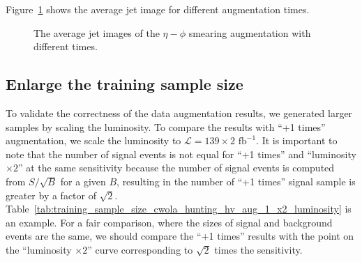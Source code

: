 \documentclass[12pt]{article}
\begin{document}
         Figure~\ref{fig:eta_phi_smearing_phi_jet_constituent_average_jet_image_aug_1_3} shows the average jet image for different augmentation times.
         \begin{figure}[htpb]
            \centering
            \caption{The average jet images of the $\eta-\phi$ smearing augmentation with different times.}
            \label{fig:eta_phi_smearing_phi_jet_constituent_average_jet_image_aug_1_3}
        \end{figure}
    \subsection{Enlarge the training sample size}%
    \label{sub:enlarge_the_training_sample_size}
        To validate the correctness of the data augmentation results, we generated larger samples by scaling the luminosity. To compare the results with ``+1 times'' augmentation, we scale the luminosity to $\mathcal{L} = 139 \times 2 \text{ fb}^{-1}$. It is important to note that the number of signal events is not equal for ``+1 times'' and ``luminosity $\times 2$'' at the same sensitivity because the number of signal events is computed from $S / \sqrt{B}$ for a given $B$, resulting in the number of ``+1 times'' signal sample is greater by a factor of $\sqrt{2}$. Table~\ref{tab:training_sample_size_cwola_hunting_hv_aug_1_x2_luminosity} is an example. For a fair comparison, where the sizes of signal and background events are the same, we should compare the ``+1 times'' results with the point on the ``luminosity $\times 2$'' curve corresponding to $\sqrt{2}$ times the sensitivity.
\end{document}
